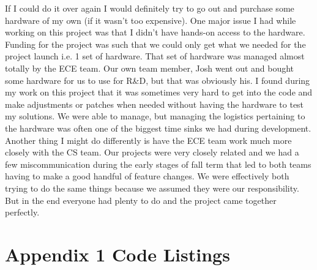 \documentclass[10pt,draftclsnofoot,onecolumn,retainorgcmds]{IEEEtran}
\begin{document}
If I could do it over again I would definitely try to go out and purchase some hardware of my own (if it wasn't too expensive). One major issue I had while working on this project was that I didn't have hands-on access to the hardware. Funding for the project was such that we could only get what we needed for the project launch i.e. 1 set of hardware. That set of hardware was managed almost totally by the ECE team. Our own team member, Josh went out and bought some hardware for us to use for R\&D, but that was obviously his. I found during my work on this project that it was sometimes very hard to get into the code and make adjustments or patches when needed without having the hardware to test my solutions. We were able to manage, but managing the logistics pertaining to the hardware was often one of the biggest time sinks we had during development. Another thing I might do differently is have the ECE team work much more closely with the CS team. Our projects were very closely related and we had a few miscommunication during the early stages of fall term that led to both teams having to make a good handful of feature changes. We were effectively both trying to do the same things because we assumed they were our responsibility. But in the end everyone had plenty to do and the project came together perfectly. \par


\section{Appendix 1 Code Listings}
\end{document}
